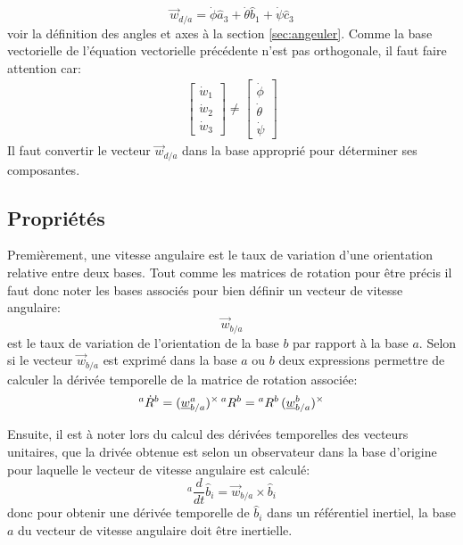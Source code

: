 \begin{equation}
\vec{w}_{d/a} = \dot{\phi} \hat{a}_3 + \dot{\theta} \hat{b}_1 + \dot{\psi} \hat{c}_3
\end{equation}
voir la définition des angles et axes à la section \ref{sec:angeuler}. Comme la base vectorielle de l'équation vectorielle précédente n'est pas orthogonale, il faut faire attention car:
\begin{align}
\left[ \begin{array}{c}
\dot{w}_1  \\
\dot{w}_2  \\
\dot{w}_3
\end{array}  \right]  \neq 
\left[ \begin{array}{c}
\dot{\phi}  \\
\dot{\theta}   \\
\dot{\psi}
\end{array}  \right]
\end{align}
Il faut convertir le vecteur $\vec{w}_{d/a}$ dans la base approprié pour déterminer ses composantes.

\subsection{Propriétés}

Premièrement, une vitesse angulaire est le taux de variation d'une orientation relative entre deux bases. Tout comme les matrices de rotation pour être précis il faut donc noter les bases associés pour bien définir un vecteur de vitesse angulaire:
\begin{equation}
\vec{w}_{b/a}
\end{equation}
est le taux de variation de l'orientation de la base $b$ par rapport à la base $a$. Selon si le vecteur $\vec{w}_{b/a}$ est exprimé dans la base $a$ ou $b$ deux expressions permettre de calculer la dérivée temporelle de la matrice de rotation associée:
\begin{equation}
{}^{a}\dot{R}^b =  (\underline{w}_{b/a}^a)^{\times} \, {}^{a}R^b =   {}^{a}R^b \, (\underline{w}_{b/a}^b)^{\times}
\end{equation}

Ensuite, il est à noter lors du calcul des dérivées temporelles des vecteurs unitaires, que la drivée obtenue est selon un observateur dans la base d'origine pour laquelle le vecteur de vitesse angulaire est calculé:
\begin{equation}
{}^{a}\frac{d}{dt}\hat{b}_i = \vec{w}_{b/a} \times \hat{b}_i
\end{equation}
donc pour obtenir une dérivée temporelle de $\hat{b}_i$ dans un référentiel inertiel, la base $a$ du vecteur de vitesse angulaire doit être inertielle.

